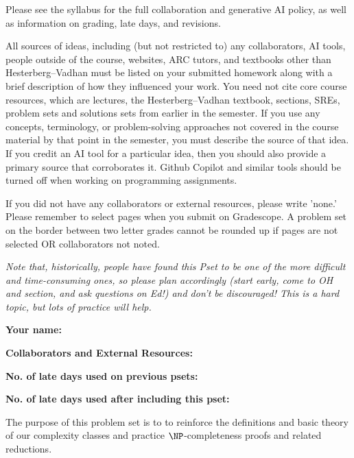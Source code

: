 \documentclass[11pt]{article}
\begin{document}

Please see the syllabus for the full collaboration and generative AI policy, as well as information on grading, late days, and revisions.

All sources of ideas, including (but not restricted to) any collaborators, AI tools, people outside of the course, websites, ARC tutors, and textbooks other than Hesterberg--Vadhan must be listed on your submitted homework along with a brief description of how they influenced your work. You need not cite core course resources, which are lectures, the Hesterberg--Vadhan textbook, sections, SREs, problem sets and solutions sets from earlier in the semester. If you use any concepts, terminology, or problem-solving approaches not covered in the course material by that point in the semester, you must describe the source of that idea. If you credit an AI tool for a particular idea, then you should also provide a primary source that corroborates it. Github Copilot and similar tools should be turned off when working on programming assignments.

If you did not have any collaborators or external resources, please write 'none.' Please remember to select pages when you submit on Gradescope. A problem set on the border between two letter grades cannot be rounded up if pages are not selected OR collaborators not noted.

\emph{Note that, historically, people have found this Pset to be one of the more difficult and time-consuming ones, so please plan accordingly (start early, come to OH and section, and ask questions on Ed!) and don't be discouraged! This is a hard topic, but lots of practice will help.}

\vspace{1em}

\textbf{Your name: }

\textbf{Collaborators and External Resources:}

\textbf{No. of late days used on previous psets: }

\textbf{No. of late days used after including this pset: }

\vspace{0.2in}

\noindent The purpose of this problem set is to to reinforce the definitions and basic theory of our complexity classes and practice $\NP$-completeness proofs and related reductions.
\end{document}
